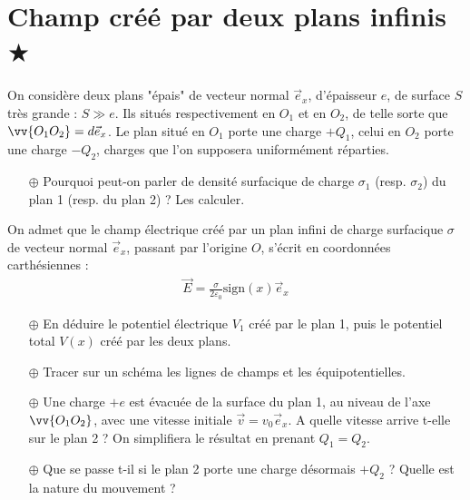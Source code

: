 \documentclass{report}
\begin{document}
\section*{Champ créé par deux plans infinis $\bigstar$}

On considère deux plans "épais" de vecteur normal $\vec{e}_x$, d'épaisseur $e$, de surface $S$ très grande : $S\gg e$. Ils situés respectivement en $O_1$ et en $O_2$, de telle sorte que $\vv{O_1O_2}=d\vec{e}_x$. Le plan situé en $O_1$ porte une charge $+Q_1$, celui en $O_2$ porte une charge $-Q_2$, charges que l'on supposera uniformément réparties. 

\begin{itemize}

	\item[$\oplus$] Pourquoi peut-on parler de densité surfacique de charge $\sigma_1$ (resp. $\sigma_2$) du plan 1 (resp. du plan 2) ? Les calculer.

\end{itemize}

On admet que le champ électrique créé par un plan infini de charge surfacique $\sigma$ de vecteur normal $\vec{e}_x$, passant par l'origine $O$, s'écrit en coordonnées carthésiennes :
\begin{align*}
	\vec{E}=\frac{\sigma}{2\varepsilon_0}\mathrm{sign}(x)\vec{e}_x
\end{align*}

\begin{itemize}

	\item[$\oplus$] En déduire le potentiel électrique $V_1$ créé par le plan 1, puis le potentiel total $V(x)$ créé par les deux plans.
	
	\item[$\oplus$] Tracer sur un schéma les lignes de champs et les équipotentielles. 
	
	\item[$\oplus$] Une charge $+e$ est évacuée de la surface du plan 1, au niveau de l'axe $\vv{O_1O_2}$, avec une vitesse initiale $\vec{v}=v_0\vec{e}_x$. A quelle vitesse arrive t-elle sur le plan 2 ? On simplifiera le résultat en prenant $Q_1=Q_2$.
	
	\item[$\oplus$] Que se passe t-il si le plan 2 porte une charge désormais $+Q_2$ ? Quelle est la nature du mouvement ? 

\end{itemize}

\newpage
\end{document}

